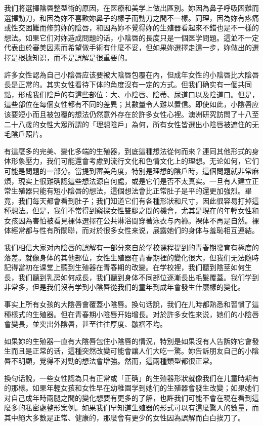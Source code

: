 \documentclass[12pt,UTF8]{ctexbook}
\begin{document}
我们將選擇陰唇整型術的原因，在医療和美学上做出區別。妳因為鼻子呼吸困難而選擇動刀，和因為妳不喜歡妳鼻子的樣子而動刀之間不一樣。同理，因為妳有疼痛或性交困難而修剪妳的陰唇，和因為妳不覺得妳的生殖器看起來不錯也是不一樣的想法。如果它们对妳造成問題的话，小陰唇的長度只是一個医学問題。這並不一定代表由於審美因素而希望做手術有什麼不妥，但如果妳選擇走這一步，妳做出的選擇是根據知识，而不是誤解是很重要的。

許多女性認為自己小陰唇应该要被大陰唇包覆在內，但成年女性的小陰唇比大陰唇長是正常的。其实女性看待下体的角度沒有一定的方式。但我们确实有一個共同點，形成我们陰戶的有這些部位：大、小陰唇、陰蒂、尿道口以及陰道口。但是，這些部位在每個女性都有不同的差異；其數量令人難以置信。即使如此，小陰唇应该要短小而且被包覆的想法仍然意外存在於許多女性心裡。澳洲研究訪問了十八至二十八歲的女性大眾所謂的「理想陰戶」為何，所有女性皆選出小陰唇被遮住的无毛陰戶照片。

有這麼多的完美、變化多端的生殖器，到底這種想法從何而來？連同其他形式的身体形象壓力，我们可能還會考慮到流行文化和色情文化上的理想。无论如何，它们可能是問題的一部分。當提到審美角度，特別是理想的陰戶時，這個問題就非常麻煩，現实上很難确認這些想法源自何處，或是它们是否不太真实。一旦有人建立正常生殖器只能有短小陰唇的想法，這個想法會比正常肚子是平的還更加強烈。畢竟，我们每天都會看到肚子；我们知道它们有各種形狀和尺寸，因此很容易打掉這種想法。但是，我们不常得到窺探女性雙腿之間的機會，尤其是現在的年輕女性和女孩因為害怕被看見裸体選擇在公共淋浴間穿著泳衣与內褲。裸体不再是自然。裸体經常都与性有所關聯，而对於很多女性来说，展露她们的身体与羞恥相互連結。

我们相信大家对內陰唇的誤解有一部分來自於学校课程提到的青春期發育有極度的落差。就像身体的其他部位，女性生殖器在青春期裡的變化很大，但我们无法隨時記得當初在课堂上聽到生殖器在青春期的改變。在学校裡，我们聽到陰莖如何生長，我们聽到乳房如何成長，我们聽到身体不同部位逐漸長出毛髮覆蓋。我们学到非常多，但是我们沒有学到小陰唇從我们的童年到成年會發生什麼樣的變化。

事实上所有女孩的大陰唇會覆蓋小陰唇。換句话說，我们在儿時都熟悉和習慣了這種樣式的生殖器。但在青春期小陰唇开始增長。对於許多女性来说，她们的小陰唇會變長，並突出外陰唇，甚至往往厚度、皺褶不均。

如果妳的生殖器一直有大陰唇包住小陰唇的情況，特別是如果沒有人告訴妳它會發生而且是正常的话，這種突然改變可能會讓人们大吃一驚。妳告訴朋友自己的小陰唇不明顯，覺得不对勁的想法會增強。然而，這兩種類型都很正常。

換句话說，一些女性認為只有正常或「正确」的生殖器形狀就像我们在儿童時期有的那樣。如果年輕女孩和女性早在幼稚園学到她们的生殖器會發生改變；如果她们对自己成年時兩腿之間的變化想要有更多的了解，也許我们可能不會在現在看到這麼多的私密處整形案例。如果我们早知道生殖器的形式可以有這麼驚人的數量，而其中絕大多數是正常、健康的，那麼會有更少的女性因為誤解而白白挨刀了。
\end{document}
